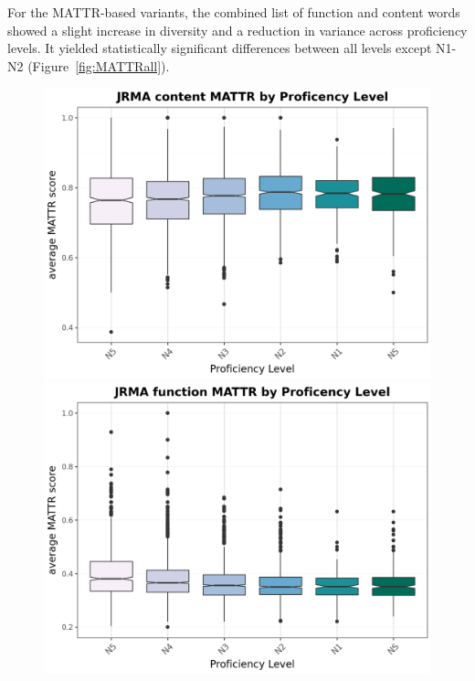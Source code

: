 


For the MATTR-based variants, the combined list of function and content words showed a slight increase in diversity
and a reduction in variance across proficiency levels. It yielded statistically significant differences between all
levels except N1-N2 (Figure~\ref{fig:MATTRall}). 

\begin{figure}[htbp]
    \centering
    \begin{minipage}{.48\textwidth}
        \centering
    \includegraphics[scale=.4]{img/JMRA-MATTRcontent}
    \caption[MATTR content]{}
        \label{fig:MATTRcontent}
    \end{minipage}
    \hfill
\begin{minipage}{.48\textwidth}
        \centering
        \includegraphics[scale=.4]{img/JMRA-MATTRfunction}

\end{minipage}
\end{figure}
